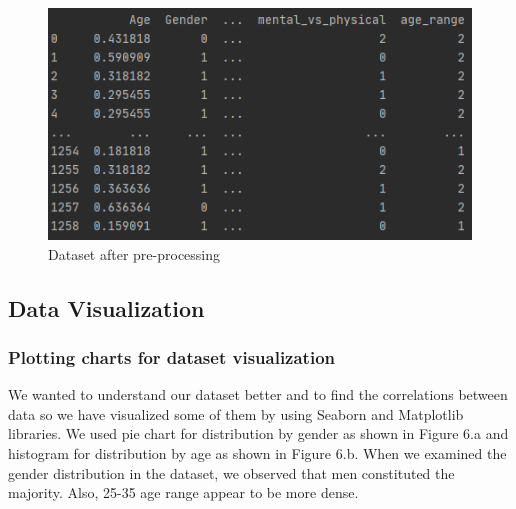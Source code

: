 \documentclass[onecolumn]{article}
\begin{document}
\begin{figure}[h]
\centering
    \includegraphics[width=.5\linewidth]{fig/fig5.png}
\caption{\label{figure5}
Dataset after pre-processing}
\end{figure}

\subsection{Data Visualization}
\subsubsection{Plotting charts for dataset visualization}
We wanted to understand our dataset better and to find the correlations between data so we have visualized some of them by using Seaborn and Matplotlib libraries. We used pie chart for distribution by gender as shown in Figure 6.a and histogram for distribution by age as shown in Figure 6.b.
When we examined the gender distribution in the dataset, we observed that men constituted the majority. Also, 25-35 age range appear to be more dense.

\begin{figure}[h]
\centering
{}
\caption{\label{}}
\end{figure}
\end{document}

